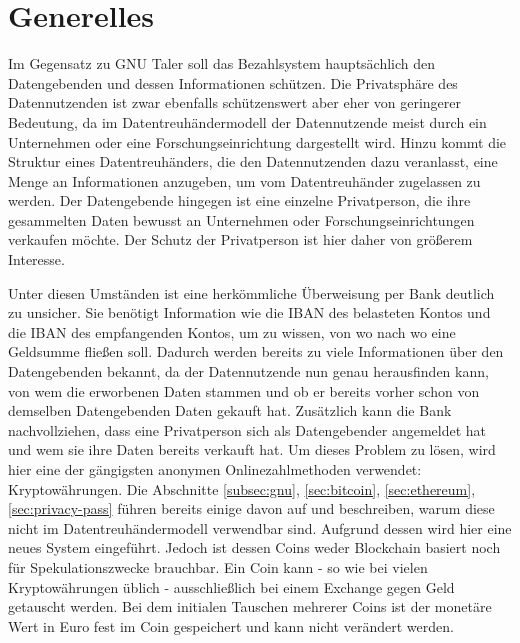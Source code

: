 \documentclass{scrreprt}
\begin{document}
 

\section{Generelles}
Im Gegensatz zu GNU Taler soll das Bezahlsystem hauptsächlich den Datengebenden und dessen Informationen schützen. Die Privatsphäre des Datennutzenden ist zwar ebenfalls schützenswert aber eher von geringerer Bedeutung, da im Datentreuhändermodell der Datennutzende meist durch ein Unternehmen oder eine Forschungseinrichtung dargestellt wird. Hinzu kommt die Struktur eines Datentreuhänders, die den Datennutzenden dazu veranlasst, eine Menge an Informationen anzugeben, um vom Datentreuhänder zugelassen zu werden. Der Datengebende hingegen ist eine einzelne Privatperson, die ihre gesammelten Daten bewusst an Unternehmen oder Forschungseinrichtungen verkaufen möchte. Der Schutz der Privatperson ist hier daher von größerem Interesse. 

Unter diesen Umständen ist eine herkömmliche Überweisung per Bank deutlich zu unsicher. Sie benötigt Information wie die IBAN des belasteten Kontos und die IBAN des empfangenden Kontos, um zu wissen, von wo nach wo eine Geldsumme fließen soll. Dadurch werden bereits zu viele Informationen über den Datengebenden bekannt, da der Datennutzende nun genau herausfinden kann, von wem die erworbenen Daten stammen und ob er bereits vorher schon von demselben Datengebenden Daten gekauft hat. Zusätzlich kann die Bank nachvollziehen, dass eine Privatperson sich als Datengebender angemeldet hat und wem sie ihre Daten bereits verkauft hat.
Um dieses Problem zu lösen, wird hier eine der gängigsten anonymen Onlinezahlmethoden verwendet: Kryptowährungen. Die Abschnitte \ref{subsec:gnu}, \ref{sec:bitcoin}, \ref{sec:ethereum}, \ref{sec:privacy-pass} führen bereits einige davon auf und beschreiben, warum diese nicht im Datentreuhändermodell verwendbar sind. Aufgrund dessen wird hier eine neues System eingeführt. Jedoch ist dessen Coins weder Blockchain basiert noch für Spekulationszwecke brauchbar. Ein Coin kann - so wie bei vielen Kryptowährungen üblich - ausschließlich bei einem Exchange gegen Geld getauscht werden. Bei dem initialen Tauschen mehrerer Coins ist der monetäre Wert in Euro fest im Coin gespeichert und kann nicht verändert werden. 
\end{document}
